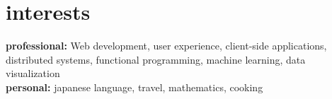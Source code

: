 \documentclass[]{friggeri-cv} %
\begin{document}

\section{interests}

\textbf{professional:} Web development, user experience, client-side applications, distributed systems, functional programming, machine learning, data visualization \\
\textbf{personal:} japanese language, travel, mathematics, cooking

\end{document}
